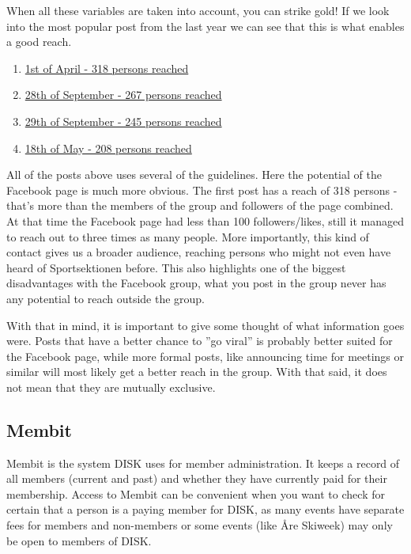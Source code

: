 \documentclass[12pt,a4paper]{article}
\begin{document}
			When all these variables are taken into account, you can strike gold! If we look into the most popular post from the last year we can see that this is what enables a good reach.
			\begin{enumerate}
				\item \href{https://www.facebook.com/sportsektionen/posts/797559543632932}{1st of April - 318 persons reached}
				\item \href{https://www.facebook.com/sportsektionen/photos/a.579827052072850.1073741829.577696502285905/878826875506198/?type=3}{28th of September - 267 persons reached}
				\item \href{https://www.facebook.com/sportsektionen/posts/879320665456819}{29th of September - 245 persons reached}
				\item \href{https://www.facebook.com/sportsektionen/posts/816932155029004}{18th of May - 208 persons reached}
			\end{enumerate}
			All of the posts above uses several of the guidelines. Here the potential of the Facebook page is much more obvious. The first post has a reach of 318 persons - that's more than the members of the group and followers of the page combined. At that time the Facebook page had less than 100 followers/likes, still it managed to reach out to three times as many people. More importantly, this kind of contact gives us a broader audience, reaching persons who might not even have heard of Sportsektionen before. This also highlights one of the biggest disadvantages with the Facebook group, what you post in the group never has any potential to reach outside the group.

			With that in mind, it is important to give some thought of what information goes were. Posts that have a better chance to ''go viral'' is probably better suited for the Facebook page, while more formal posts, like announcing time for meetings or similar will most likely get a better reach in the group. With that said, it does not mean that they are mutually exclusive.

		\subsection{Membit}
			Membit is the system DISK uses for member administration. It keeps a record of all members (current and past) and whether they have currently paid for their membership. Access to Membit can be convenient when you want to check for certain that a person is a paying member for DISK, as many events have separate fees for members and non-members or some events (like Åre Skiweek) may only be open to members of DISK.
\end{document}
